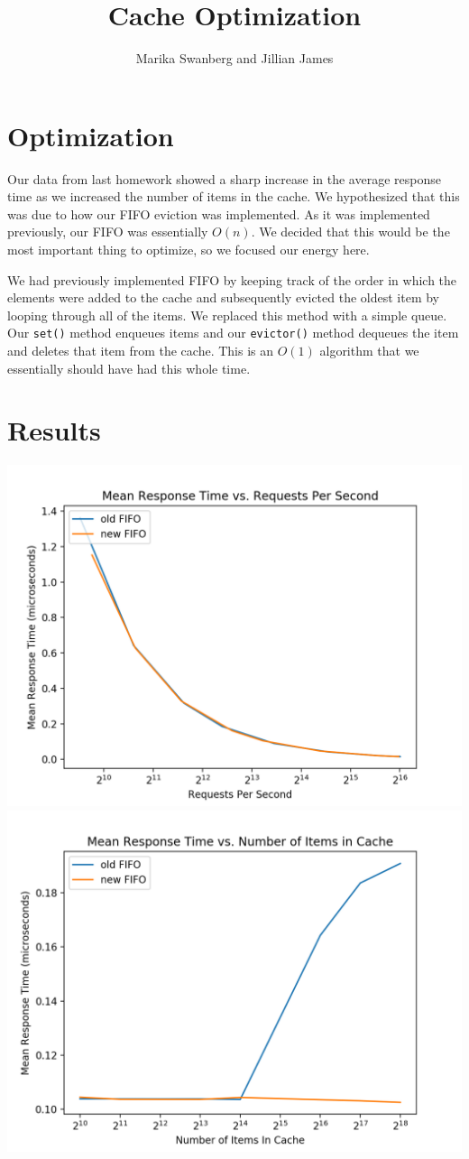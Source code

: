 \documentclass[12pt]{article}
\author{Marika Swanberg and Jillian James}
\title{Cache Optimization}
\date{}
\begin{document}
\maketitle
\section{Optimization}
Our data from last homework showed a sharp increase in the average response time as we increased the number of items in the cache. We hypothesized that this was due to how our FIFO eviction was implemented. As it was implemented previously, our FIFO was essentially $O(n)$. We decided that this would be the most important thing to optimize, so we focused our energy here. 

We had previously implemented FIFO by keeping track of the order in which the elements were added to the cache and subsequently evicted the oldest item by looping through all of the items. We replaced this method with a simple queue. Our \texttt{set()} method enqueues items and our \texttt{evictor()} method dequeues the item and deletes that item from the cache. This is an $O(1)$ algorithm that we essentially should have had this whole time.

\section{Results}
\bigskip 

\begin{center}
\includegraphics[scale=0.75]{reqs_per_sec_newold.png}
\includegraphics[scale=0.75]{resp_time_items_cache_newold.png}
\end{center}
\end{document}
